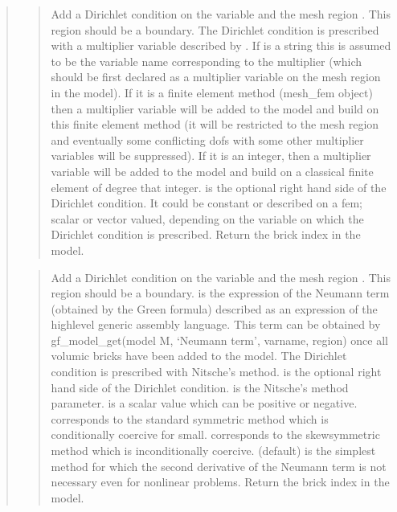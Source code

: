 \documentclass[a4paper,11pt,english]{sphinxmanual}
\begin{document}
\begin{quote}
\sphinxAtStartPar
{}
\begin{quote}

\sphinxAtStartPar
Add a Dirichlet condition on the variable  and the mesh
region . This region should be a boundary. The Dirichlet
condition is prescribed with a multiplier variable described by
. If  is a string this is assumed
to be the variable name corresponding to the multiplier (which should be
first declared as a multiplier variable on the mesh region in the model).
If it is a finite element method (mesh\_fem object) then a multiplier
variable will be added to the model and build on this finite element
method (it will be restricted to the mesh region  and eventually
some conflicting dofs with some other multiplier variables will be
suppressed). If it is an integer, then a  multiplier variable will be
added to the model and build on a classical finite element of degree
that integer.  is the optional right hand side of  the
Dirichlet condition. It could be constant or described on a fem; scalar
or vector valued, depending on the variable on which the Dirichlet
condition is prescribed. Return the brick index in the model.
\end{quote}

\sphinxAtStartPar
{}
\begin{quote}

\sphinxAtStartPar
Add a Dirichlet condition on the variable  and the mesh
region . This region should be a boundary. 
is the expression of the Neumann term (obtained by the Green formula)
described as an expression of the high\sphinxhyphen{}level
generic assembly language. This term can be obtained by
gf\_model\_get(model M, ‘Neumann term’, varname, region) once all volumic bricks have
been added to the model. The Dirichlet
condition is prescribed with Nitsche’s method.  is the optional
right hand side of the Dirichlet condition.  is the
Nitsche’s method parameter.  is a scalar value which can be
positive or negative.  corresponds to the standard symmetric
method which is conditionally coercive for   small.
 corresponds to the skew\sphinxhyphen{}symmetric method which is
inconditionally coercive.  (default) is the simplest method
for which the second derivative of the Neumann term is not necessary
even for nonlinear problems. Return the brick index in the model.
\end{quote}


\end{quote}
\end{document}
